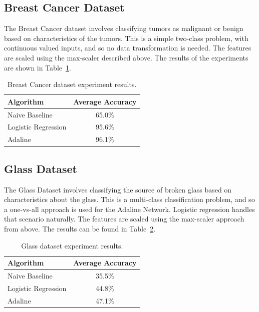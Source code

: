 \documentclass{amsart}
\begin{document}
    \subsection{Breast Cancer Dataset}
    The Breast Cancer dataset\cite{cancerdataset} involves classifying tumors as malignant or benign based
    on characteristics of the tumors. This is a simple two-class problem, with continuous valued inputs, and
    so no data transformation is needed. The features are scaled using the max-scaler described above.
    The results of the experiments are shown in Table~\ref{breast_results}.
    \begin{table}[H]
    \begin{tabular}{lc}
    Algorithm & Average Accuracy \\
    \hline
    Naive Baseline & 65.0\% \\
    Logistic Regression & 95.6\% \\
    Adaline & 96.1\%
    \end{tabular}
    \caption{Breast Cancer dataset experiment results.}
    \label{breast_results}
    \end{table}

    \subsection{Glass Dataset}
    The Glass Dataset\cite{glassdataset} involves classifying the source of
    broken glass based on characteristics about the glass. This is a multi-class
    classification problem, and so a one-vs-all approach is used for the
    Adaline Network. Logistic regression handles that scenario naturally.
    The features are scaled using the max-scaler approach from above.
    The results can be found in Table~\ref{glass_results}.
    \begin{table}[H]
    \begin{tabular}{lc}
    Algorithm & Average Accuracy \\
    \hline
    Naive Baseline & 35.5\% \\
    Logistic Regression & 44.8\% \\
    Adaline & 47.1\%
    \end{tabular}
    \label{glass_results}
        \caption{Glass dataset experiment results.}
    \end{table}
\end{document}
